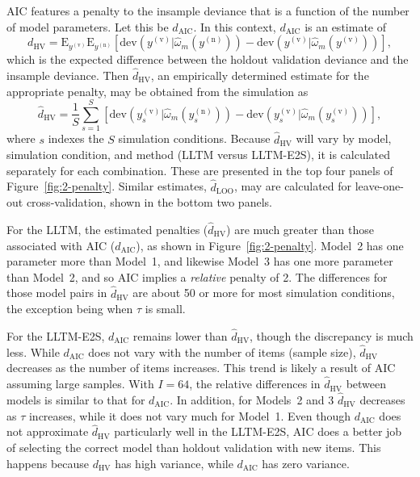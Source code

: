 AIC features a penalty to the insample deviance that is a function of the number of model parameters. Let this be $d_\mathrm{AIC}$. In this context, $d_\mathrm{AIC}$ is an estimate of
\begin{equation}
	d_{\mathrm{HV}} = \mathrm{E}_{y^{(\mathrm{v})}} \mathrm{E}_{y^{(\mathrm{n})}} 
	[
		\mathrm{dev}(y^{(\mathrm{v})} | \hat \omega_m(y^{(\mathrm{n})})) -
		\mathrm{dev}(y^{(\mathrm{v})} | \hat \omega_m(y^{(\mathrm{v})}))
	]
,\end{equation}
which is the expected difference between the holdout validation deviance and the insample deviance. Then $\hat d_{\mathrm{HV}}$, an empirically determined estimate for the appropriate penalty, may be obtained from the simulation as
\begin{equation}
	\hat d_{\mathrm{HV}} = \frac{1}{S} \sum_{s=1}^{S} 
	\left [
		\mathrm{dev}(y^{(\mathrm{v})}_s | \hat \omega_m(y^{(\mathrm{n})}_s)) -
		\mathrm{dev}(y^{(\mathrm{v})}_s | \hat \omega_m(y^{(\mathrm{v})}_s))
	\right ]
,\end{equation}
where $s$ indexes the $S$ simulation conditions.
Because $\hat d_{\mathrm{HV}}$ will vary by model, simulation condition, and method (LLTM versus LLTM-E2S), it is calculated separately for each combination. These are presented in the top four panels of Figure~\ref{fig:2-penalty}. Similar estimates, $\hat d_{\mathrm{LOO}}$, may are calculated for leave-one-out cross-validation, shown in the bottom two panels.

For the LLTM, the estimated penalties ($\hat d_{\mathrm{HV}}$) are much greater than those associated with AIC ($d_\mathrm{AIC}$), as shown in Figure~\ref{fig:2-penalty}. Model~2 has one parameter more than Model~1, and likewise Model~3 has one more parameter than Model~2, and so AIC implies a \emph{relative} penalty of 2. The differences for those model pairs in $\hat d_{\mathrm{HV}}$ are about 50 or more for most simulation conditions, the exception being when $\tau$ is small.

For the LLTM-E2S, $d_\mathrm{AIC}$ remains lower than $\hat d_{\mathrm{HV}}$, though the discrepancy is much less. While $d_\mathrm{AIC}$ does not vary with the number of items (sample size), $\hat d_{\mathrm{HV}}$ decreases as the number of items increases. This trend is likely a result of AIC assuming large samples. With $I=64$, the relative differences in $\hat d_{\mathrm{HV}}$ between models is similar to that for $d_\mathrm{AIC}$. In addition, for Models~2 and 3 $\hat d_{\mathrm{HV}}$ decreases as $\tau$ increases, while it does not vary much for Model~1. Even though $d_\mathrm{AIC}$ does not approximate $\hat d_{\mathrm{HV}}$ particularly well in the LLTM-E2S, AIC does a better job of selecting the correct model than holdout validation with new items. This happens because $d_{\mathrm{HV}}$ has high variance, while $d_\mathrm{AIC}$ has zero variance.

